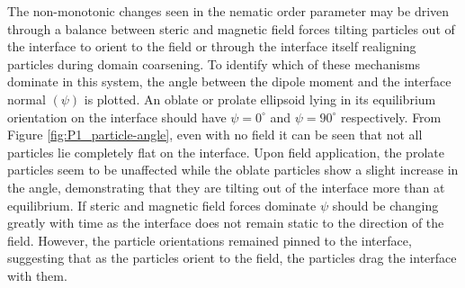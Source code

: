 The non-monotonic changes seen in the nematic order parameter may be driven through a balance between steric and magnetic field forces tilting particles out of the interface to orient to the field or through the interface itself realigning particles during domain coarsening. To identify which of these mechanisms dominate in this system, the angle between the dipole moment and the interface normal $(\psi)$ is plotted. An oblate or prolate ellipsoid lying in its equilibrium orientation on the interface should have $\psi = 0 ^{\circ}$ and $\psi = 90 ^{\circ}$ respectively. From Figure \ref{fig:P1_particle-angle}, even with no field it can be seen that not all particles lie completely flat on the interface. Upon field application, the prolate particles seem to be unaffected while the oblate particles show a slight increase in the angle, demonstrating that they are tilting out of the interface more than at equilibrium. If steric and magnetic field forces dominate $\psi$ should be changing greatly with time as the interface does not remain static to the direction of the field. However, the particle orientations remained pinned to the interface, suggesting that as the particles orient to the field, the particles drag the interface with them.
